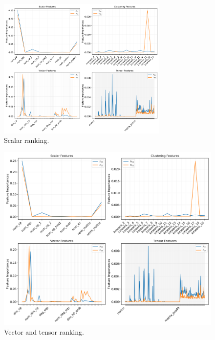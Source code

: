     \begin{figure}[!t]
        \centering
        \includegraphics[width=0.75\textwidth,
                         trim={0 5in 6in 0},
                         clip
                        ]{tex/img/feature_importances.png}
        \caption{Scalar ranking.}
        \label{fig:scalar_importances}
    \end{figure}
    
    \begin{figure}[!t]
        \centering
        \includegraphics[width=\textwidth,
                         trim={0 0 0 5in},
                         clip
                        ]{tex/img/feature_importances.png}
        \caption{Vector and tensor ranking.}
        \label{fig:vector_tensor_importances}
    \end{figure}
    
